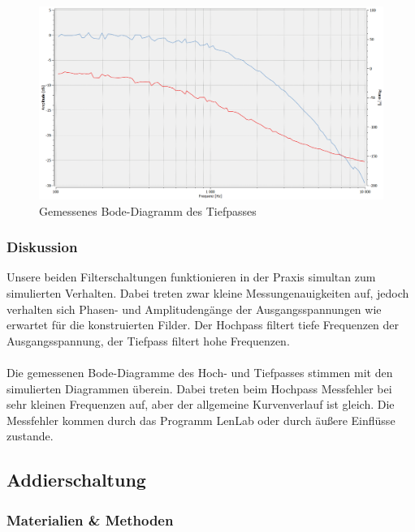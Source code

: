 \newpage

\begin{figure}[htb]
    \includegraphics[width=14cm]{./pictures/Messungen/tiefpass_Bode_Test}
    \caption{Gemessenes Bode-Diagramm des Tiefpasses}
    \label{fig:Tiefpass_Bode_Test}
\end{figure}

\subsubsection{Diskussion}

Unsere beiden Filterschaltungen funktionieren in der Praxis simultan zum simulierten Verhalten. Dabei treten zwar kleine Messungenauigkeiten auf, jedoch verhalten sich Phasen- und Amplitudengänge der Ausgangsspannungen wie erwartet für die konstruierten Filder. Der Hochpass filtert tiefe Frequenzen der Ausgangsspannung, der Tiefpass filtert hohe Frequenzen. 
\\
\\
Die gemessenen Bode-Diagramme des Hoch- und Tiefpasses stimmen mit den simulierten Diagrammen überein. Dabei treten beim Hochpass Messfehler bei sehr kleinen Frequenzen auf, aber der allgemeine Kurvenverlauf ist gleich. Die Messfehler kommen durch das Programm LenLab oder durch äußere Einflüsse zustande.

\newpage
\subsection{Addierschaltung}

\subsubsection{Materialien \& Methoden}

